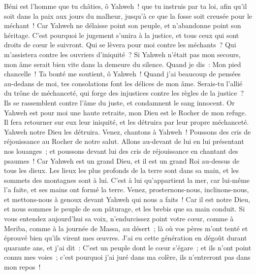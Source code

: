 \begin{multicols}{2}
Béni est l'homme que tu châties, ô Yahweh~! que tu instruis par ta loi,
afin qu'il soit dans la paix aux jours du malheur, jusqu'à ce que la fosse soit creusée pour le méchant~!
Car Yahweh ne délaisse point son peuple, et n'abandonne point son héritage.
C'est pourquoi le jugement s'unira à la justice, et tous ceux qui sont droits de cœur le suivront.
Qui se lèvera pour moi contre les méchants~? Qui m'assistera contre les ouvriers d'iniquité~?
Si Yahweh n'était pas mon secours, mon âme serait bien vite dans la demeure du silence.
Quand je dis~: Mon pied chancelle~! Ta bonté me soutient, ô Yahweh~!
Quand j'ai beaucoup de pensées au-dedans de moi, tes consolations font les délices de mon âme.
Serais-tu l'allié du trône de méchanceté, qui forge des injustices contre les règles de la justice~?
Ils se rassemblent contre l'âme du juste, et condamnent le sang innocent.
Or Yahweh est pour moi une haute retraite, mon Dieu est le Rocher de mon refuge.
Il fera retourner sur eux leur iniquité, et les détruira par leur propre méchanceté. Yahweh notre Dieu les détruira.
\VerseOne{}Venez, chantons à Yahweh~! Poussons des cris de réjouissance au Rocher de notre salut.
Allons au-devant de lui en lui présentant nos louanges~; et poussons devant lui des cris de réjouissance en chantant des psaumes~!
Car Yahweh est un grand Dieu, et il est un grand Roi au-dessus de tous les dieux.
Les lieux les plus profonds de la terre sont dans sa main, et les sommets des montagnes sont à lui.
C'est à lui qu'appartient la mer, car lui-même l'a faite, et ses mains ont formé la terre.
Venez, prosternons-nous, inclinons-nous, et mettons-nous à genoux devant Yahweh qui nous a faits~!
Car il est notre Dieu, et nous sommes le peuple de son pâturage, et les brebis que sa main conduit. Si vous entendez aujourd'hui sa voix,
n'endurcissez point votre cœur, comme à Meriba, comme à la journée de Massa, au désert~;
là où vos pères m'ont tenté et éprouvé bien qu'ils virent mes œuvres.
J'ai eu cette génération en dégoût durant quarante ans, et j'ai dit~: C'est un peuple dont le cœur s'égare~; et ils n'ont point connu mes voies~;
c'est pourquoi j'ai juré dans ma colère, ils n'entreront pas dans mon repos~!

\end{multicols}
